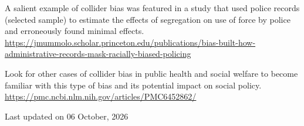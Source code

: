 \documentclass[
]{article}
\begin{document}
A salient example of collider bias was featured in a study that used
police records (selected sample) to estimate the effects of segregation
on use of force by police and erroneously found minimal effects.
\url{https://jmummolo.scholar.princeton.edu/publications/bias-built-how-administrative-records-mask-racially-biased-policing}

Look for other cases of collider bias in public health and social
welfare to become familiar with this type of bias and its potential
impact on social policy.
\url{https://pmc.ncbi.nlm.nih.gov/articles/PMC6452862/}

Last updated on 06 October, 2026
\end{document}
